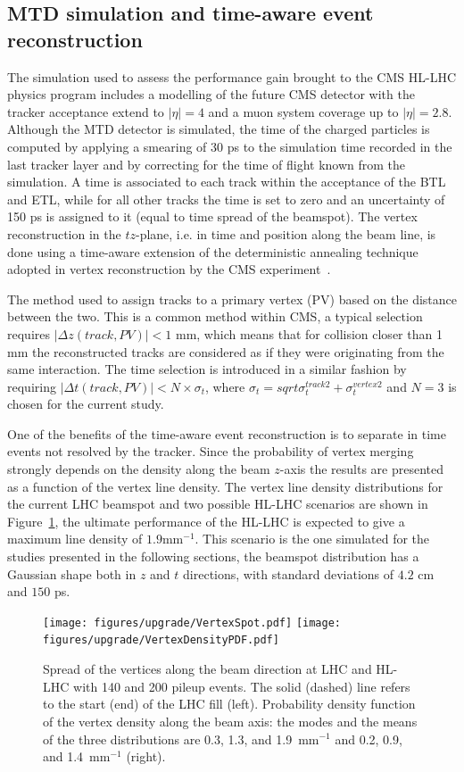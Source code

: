 \subsection{MTD simulation and time-aware event reconstruction}
The simulation used to assess the performance gain brought to the CMS HL-LHC physics program
includes a modelling of the future CMS detector with the tracker acceptance extend to $|\eta|=4$ and
a muon system coverage up to $|\eta|=2.8$. 
Although the MTD detector is simulated, the time of the charged particles
is computed by applying a smearing of 30 ps to the simulation time recorded in the last tracker layer and by
correcting for the time of flight known from the simulation. A time is associated to each track within the acceptance of the BTL
and ETL, while for all other tracks the time is set to zero and an uncertainty of 150 ps is assigned to it (equal to time
spread of the beamspot).
The vertex reconstruction in the $tz$-plane, i.e. in time and position along the
beam line, is done using a time-aware extension of the deterministic
annealing technique adopted in vertex reconstruction by the CMS experiment~\cite{Chatrchyan:2014fea}.

The method used to assign tracks to a primary vertex (PV) based on the distance between the two. This is a common
method within CMS, a typical selection 
requires $|\Delta z(track, PV)| < 1$ mm, which means that for collision closer than 1 mm the reconstructed tracks are
considered as if they were originating from the same interaction. The time selection is introduced in a similar
fashion by requiring $|\Delta t(track, PV)| < N\times\sigma_t$, where $\sigma_t = sqrt{\sigma_t^{track 2}+\sigma_t^{vertex 2}}$
and $N=3$ is chosen for the current study.

One of the benefits of the time-aware event reconstruction is to separate in time events not resolved by
the tracker. Since the probability of vertex merging strongly depends on the density along the beam $z$-axis the
results are presented as a function of the vertex line density.
The vertex line density distributions for the current LHC beamspot and
two possible HL-LHC scenarios are shown in Figure~\ref{fig:vtx_density}, the ultimate
performance of the HL-LHC is expected to give a maximum line density of $1.9$mm$^{-1}$. This scenario is the one simulated
for the studies presented in the following sections, the beamspot distribution
has a Gaussian shape both in $z$ and $t$ directions, with standard deviations of $4.2$ cm and $150$ ps.

\begin{figure}
  \centering
  \texttt{[image: figures/upgrade/VertexSpot.pdf]}
  \texttt{[image: figures/upgrade/VertexDensityPDF.pdf]}
  \caption{Spread of the vertices along the beam direction at LHC and HL-LHC with 140 and 200 pileup events. 
    The solid (dashed) line refers to the start (end) of the LHC fill (left).
    Probability density function of the vertex density along the beam axis:
    the modes and the means of the three distributions are 0.3, 1.3, and 1.9~mm$^{-1}$ and 0.2, 0.9, and 1.4~mm$^{-1}$ (right).} 
  \label{fig:vtx_density}
\end{figure}


